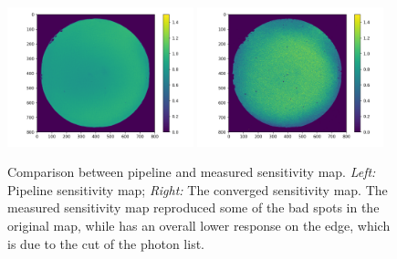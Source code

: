 \documentclass[12pt, preprint]{aastex61}
\begin{document}
\begin{figure}[p]
\begin{center}
\includegraphics[width=0.48\textwidth]{figures/flato}
\includegraphics[width=0.48\textwidth]{figures/flat}
\end{center}
\caption{
  \label{flat}
  Comparison between pipeline and measured sensitivity map.
  \emph{Left:} Pipeline sensitivity map;
  \emph{Right:} The converged sensitivity map.
  The measured sensitivity map reproduced some of the bad spots in the original map, while has an overall lower response on the edge, which is due to the cut of the photon list.
}
\end{figure}
\end{document}
